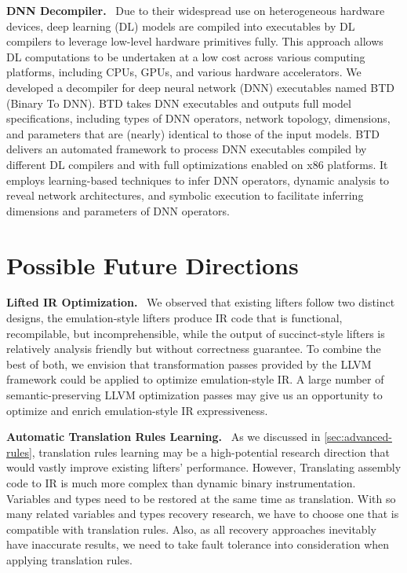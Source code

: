 \noindent\textbf{DNN Decompiler.}~
Due to their widespread use on heterogeneous hardware devices, deep learning 
(DL) models are compiled into executables by DL compilers to leverage low-level 
hardware primitives fully. This approach allows DL computations to be 
undertaken at a low cost across various computing platforms, including CPUs, 
GPUs, and various hardware accelerators.
We developed a decompiler for deep neural network (DNN) executables named BTD 
(Binary To DNN). BTD takes DNN executables and outputs full model 
specifications, including types of DNN operators, network topology, dimensions, 
and parameters that are (nearly) identical to those of the input models. BTD 
delivers an automated framework to process DNN executables compiled by 
different DL compilers and with full optimizations enabled on x86 platforms. It 
employs learning-based techniques to infer DNN operators, dynamic analysis to 
reveal network architectures, and symbolic execution to facilitate inferring 
dimensions and parameters of DNN operators. 


\section{Possible Future Directions}\label{sec:future-directions}
\noindent\textbf{Lifted IR Optimization.}~
We observed that existing lifters follow two distinct designs, the 
emulation-style lifters produce IR code that is functional, recompilable, but 
incomprehensible, while the output of succinct-style lifters is relatively 
analysis friendly but without correctness guarantee. To combine the best of 
both, we envision that transformation passes provided by the LLVM framework 
could be applied to optimize emulation-style IR. A large number of 
semantic-preserving LLVM optimization passes may give us an opportunity to 
optimize and enrich emulation-style IR expressiveness.

\noindent\textbf{Automatic Translation Rules Learning.}~
As we discussed in \autoref{sec:advanced-rules}, translation rules learning may 
be a high-potential research direction that would vastly improve existing 
lifters' performance. However, Translating assembly code to IR is much more 
complex than dynamic binary instrumentation. Variables and types need to be 
restored at the same time as translation. With so many related variables and 
types recovery research, we have to choose one that is compatible with 
translation rules. Also, as all recovery approaches inevitably have inaccurate 
results, we need to take fault tolerance into consideration when applying 
translation rules.


\newpage
